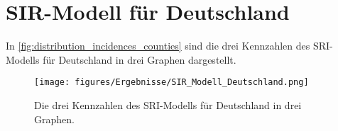 \section{SIR-Modell für Deutschland}
In \autoref{fig:distribution_incidences_counties} sind die drei Kennzahlen des SRI-Modells für Deutschland in drei Graphen dargestellt.
\begin{figure}[H]
    \centering
    \texttt{[image: figures/Ergebnisse/SIR\_Modell\_Deutschland.png]}
    \caption{Die drei Kennzahlen des SRI-Modells für Deutschland in drei Graphen.}
    \label{fig:SRI_Deutschland}
\end{figure}